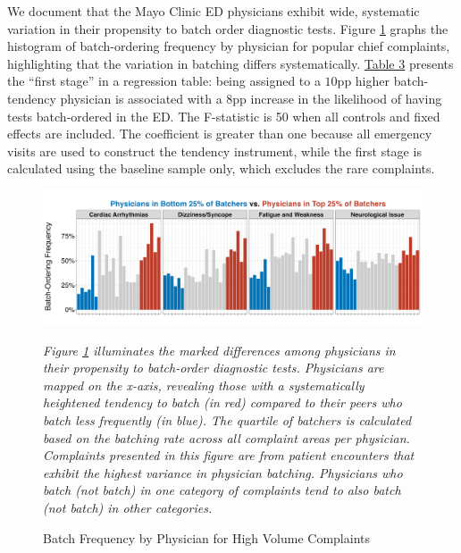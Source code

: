 \documentclass[,,nonblindrev]{informs}
\begin{document}
We document that the Mayo Clinic ED physicians exhibit wide, systematic
variation in their propensity to batch order diagnostic tests. Figure
\ref{fig:physician_batching} graphs the histogram of batch-ordering
frequency by physician for popular chief complaints, highlighting that
the variation in batching differs systematically.
\hyperref[tab:regression]{Table 3} presents the ``first stage'' in a
regression table: being assigned to a \(10\)pp higher batch-tendency
physician is associated with a \(8\)pp increase in the likelihood of
having tests batch-ordered in the ED. The F-statistic is 50 when all
controls and fixed effects are included. The coefficient is greater than
one because all emergency visits are used to construct the tendency
instrument, while the first stage is calculated using the baseline
sample only, which excludes the rare complaints.

\begin{figure}[h]
  \centering
  \caption{Batch Frequency by Physician for High Volume Complaints}
  \label{fig:physician_batching}
  \includegraphics[width=1\textwidth]{../outputs/figures/Figure 2.png}
\begin{tablenotes}
\tiny
\item \textit{Figure \ref{fig:physician_batching} illuminates the marked differences among physicians in their propensity to batch-order diagnostic tests. Physicians are mapped on the x-axis, revealing those with a systematically heightened tendency to batch (in red) compared to their peers who batch less frequently (in blue). The quartile of batchers is calculated based on the batching rate across all complaint areas per physician. Complaints presented in this figure are from patient encounters that exhibit the highest variance in physician batching. Physicians who batch (not batch) in one category of complaints tend to also batch (not batch) in other categories.}
\end{tablenotes}  
\end{figure}
\end{document}
